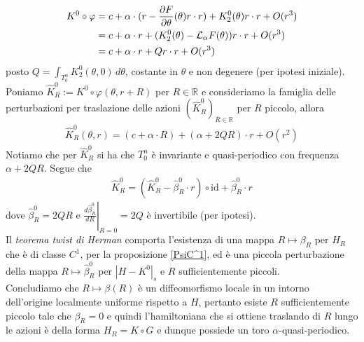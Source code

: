 \documentclass[twoside, 11pt]{amsbook}
\makeatletter
\newcommand{\0}{{(0)}}
\newcommand{\3}{{(3)}}
\theoremstyle{colonplain}
\theoremstyle{colondefinition}
\theoremstyle{colonremark}
\numberwithin{equation}{chapter}
\renewcommand{\proofname}{Dimostrazione}
\renewenvironment{proof}[1][\proofname]{\par
  \pushQED{\qed}%
  \normalfont \topsep6\p@\@plus6\p@\relax
  \trivlist
  \item[\hskip\labelsep\bfseries #1:]\ignorespaces
}{%
  \popQED\endtrivlist\@endpefalse
}
\makeatother
\begin{document}
\begin{proof}
\begin{align}
    K^0 \circ \varphi &= c + \alpha \cdot (r - \frac{\partial F}{\partial \theta}(\theta)r \cdot r) + K^0_2(\theta)r \cdot r + O(r^3) \notag \\
    &= c + \alpha \cdot r + (K^0_2(\theta) - \mathcal{L}_\alpha F(\theta))r \cdot r + O(r^3) \notag \\
    &= c + \alpha \cdot r + Qr \cdot r + O(r^3) 
\end{align}
posto $Q = \int_{T^n_0} K^0_2(\theta, 0) \, d\theta$, costante in $\theta$ e non degenere (per ipotesi iniziale). \\
Poniamo $\widehat{K}^0_R := K^0 \circ \varphi (\theta, r + R)$ per $R \in \mathbb{R}$ e consideriamo la famiglia delle perturbazioni per traslazione delle azioni $(\widehat{K}^0_R)_{R \in \mathbb{R}}$ per $R$ piccolo, allora
\begin{align}
    \widehat{K}^0_R(\theta, r) = (c + \alpha \cdot R) + (\alpha + 2QR) \cdot r + O(r^2)
\end{align}
Notiamo che per $\widehat{K}^0_R$ si ha che $T^n_0$ è invariante e quasi-periodico con frequenza $\alpha + 2QR$. Segue che
\begin{align}
    \widehat{K}^0_R = (\widehat{K}^0_R - \widehat{\beta}^0_R \cdot r) \circ \mathrm{id} + \widehat{\beta}^0_R \cdot r
\end{align}
dove $\widehat{\beta}^0_R = 2QR$ e $\left.\frac{d\widehat{\beta}^0_R}{dR}\right|_{R = 0} = 2Q$ è invertibile (per ipotesi). \\
Il \textit{teorema twist di Herman} comporta l'esistenza di una mappa $R \mapsto \beta_R$ per $H_R$ che è di classe $C^1$, per la proposizione \ref{PsiC^1}, ed è una piccola perturbazione della mappa $R \mapsto \widehat{\beta}^0_R$ per $|H - K^0|_s$ e $R$ sufficientemente piccoli. \\
Concludiamo che $R \mapsto \beta(R)$ è un diffeomorfismo locale in un intorno dell'origine localmente uniforme rispetto a $H$, pertanto esiste $R$ sufficientemente piccolo tale che $\beta_R = 0$ e quindi l'hamiltoniana che si ottiene traslando di $R$ lungo le azioni è della forma $H_R = K \circ G$ e dunque possiede un toro $\alpha$-quasi-periodico. \end{proof}

\appendix
\end{document}
